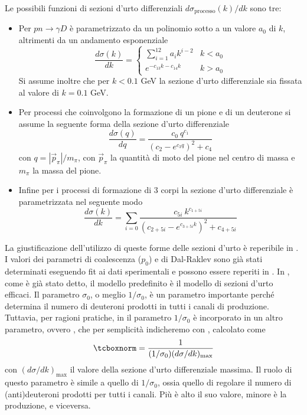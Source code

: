 Le possibili funzioni di sezioni d'urto differenziali ${d\sigma_\text{processo}(k)}/{dk}$ sono tre:
\begin{itemize}
    \item Per $pn\to\gamma D$ è parametrizzato da un polinomio sotto a un valore $a_0$ di $k$, altrimenti da un andamento esponenziale
    \begin{equation}
        \dfrac{d\sigma(k)}{dk} =
        \begin{cases}
            \displaystyle\sum_{i=1}^{12}a_ik^{i-2} & k<a_0 \\
            e^{-c_{13}k - c_{14}k} & k>a_0
        \end{cases}
    \end{equation}
    Si assume inoltre che per $k<0.1$ GeV la sezione d'urto differenziale sia fissata al valore di $k=0.1$ GeV.

    \item Per processi che coinvolgono la formazione di un pione e di un deuterone si assume la seguente forma della sezione d'urto differenziale
    \begin{equation}
        \dfrac{d\sigma(q)}{dq} = \dfrac{c_0\ q^{c_1}}{(c_2-e^{c_3 q})^2 + c_4}
    \end{equation}
    con $q = |\vec p_\pi|/m_\pi$, con $\vec p_\pi$ la quantità di moto del pione nel centro di massa e $m_\pi$ la massa del pione.

    \item Infine per i processi di formazione di 3 corpi la sezione d'urto differenziale è parametrizzata nel seguente modo
    \begin{equation}
        \dfrac{d\sigma(k)}{dk} = \sum_{i=0}\dfrac{c_{5i}\ k^{c_{1+5i}}}{(c_{2 + 5i}-e^{c_{3 + 5i} k})^2 + c_{4 + 5i}}
    \end{equation}
\end{itemize}
La giustificazione dell'utilizzo di queste forme delle sezioni d'urto è reperibile in \cite{Dal_2015}.\\

I valori dei parametri di coalescenza ($p_0$) e di Dal-Raklev sono già stati determinati eseguendo fit ai dati sperimentali e possono essere reperiti in \cite{Dal_2015}.
In \pythiaa{}, come è già stato detto, il modello predefinito è il modello di sezioni d'urto efficaci.
Il parametro $\sigma_0$, o meglio $1/\sigma_0$, è un parametro importante perché determina il numero di deuteroni prodotti in tutti i canali di produzione. 
Tuttavia, per ragioni pratiche, in \pythiaa{} il parametro $1/\sigma_0$ è incorporato in un altro parametro, ovvero , che per semplicità indicheremo con , calcolato come 
\begin{equation}\label{eq:norm}
    \ttbox{norm} = \dfrac{1}{(1/\sigma_0)(d\sigma/dk)_\text{max}}
\end{equation}
con $(d\sigma/dk)_\text{max}$ il valore della sezione d'urto differenziale massima.
Il ruolo di questo parametro è simile a quello di $1/\sigma_0$, ossia quello di regolare il numero di (anti)deuteroni prodotti per tutti i canali. Più è alto il suo valore, minore è la produzione, e viceversa.\\

